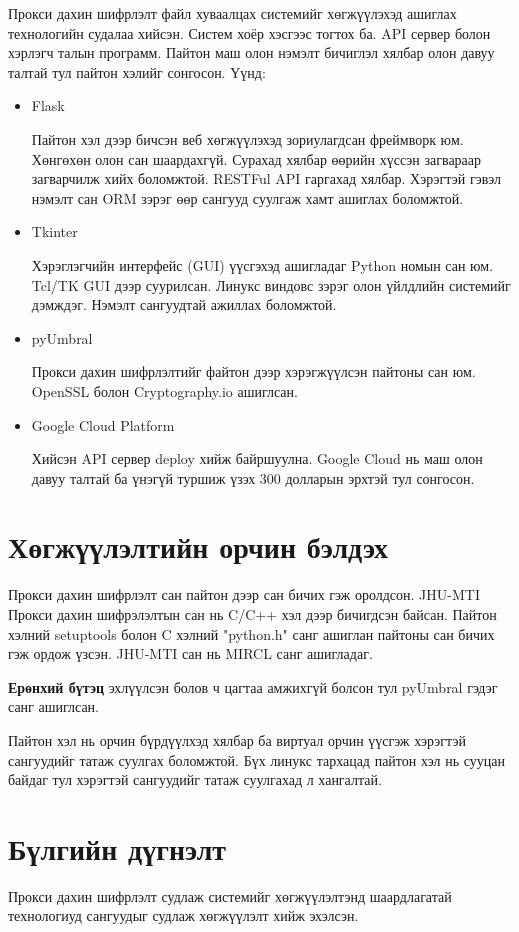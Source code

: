 Прокси дахин шифрлэлт файл хуваалцах системийг хөгжүүлэхэд ашиглах технологийн судалаа хийсэн.
Систем хоёр хэсгээс тогтох ба. API сервер болон хэрлэгч талын программ. Пайтон маш олон нэмэлт бичиглэл хялбар олон давуу талтай тул пайтон хэлийг сонгосон. Үүнд:
\begin{itemize}
    \item Flask
    
    Пайтон хэл дээр бичсэн веб хөгжүүлэхэд зориулагдсан фреймворк юм. Хөнгөхөн олон сан шаардахгүй. Сурахад хялбар өөрийн хүссэн загвараар загварчилж хийх боломжтой. RESTFul API гаргахад хялбар. Хэрэгтэй гэвэл нэмэлт сан ORM зэрэг өөр сангууд суулгаж хамт ашиглах боломжтой.
    \item Tkinter
    
    Хэрэглэгчийн интерфейс (GUI) үүсгэхэд ашигладаг Python номын сан юм. Tcl/TK GUI дээр суурилсан. Линукс виндовс зэрэг олон үйлдлийн системийг дэмждэг. Нэмэлт сангуудтай ажиллах боломжтой.
    \item pyUmbral
    
    Прокси дахин шифрлэлтийг файтон дээр хэрэгжүүлсэн пайтоны сан юм. OpenSSL болон Cryptography.io ашиглсан.
    \item Google Cloud Platform
    
    Хийсэн API сервер deploy хийж байршуулна. Google Cloud нь маш олон давуу талтай ба үнэгүй туршиж үзэх 300 долларын эрхтэй тул сонгосон.
\end{itemize}

\section{Хөгжүүлэлтийн орчин бэлдэх}

Прокси дахин шифрлэлт сан пайтон дээр сан бичих гэж оролдсон. JHU-MTI Прокси дахин шифрэлэлтын сан нь C/C++ хэл дээр бичигдсэн байсан. Пайтон хэлний setuptools болон C хэлний "python.h" санг
ашиглан пайтоны сан бичих гэж ордож үзсэн. JHU-MTI сан нь MIRCL санг ашигладаг.

\textbf{Ерөнхий бүтэц}
эхлүүлсэн болов ч цагтаа амжихгүй болсон тул pyUmbral гэдэг санг ашиглсан. 

Пайтон хэл нь орчин бүрдүүлхэд хялбар ба виртуал орчин үүсгэж хэрэгтэй сангуудийг татаж суулгах боломжтой. Бүх линукс тархацад пайтон хэл нь сууцан байдаг тул хэрэгтэй сангуудийг татаж суулгахад л хангалтай.

\section{Бүлгийн дүгнэлт}
Прокси дахин шифрлэлт судлаж системийг хөгжүүлэлтэнд шаардлагатай технологиуд сангуудыг судлаж хөгжүүлэлт хийж эхэлсэн.